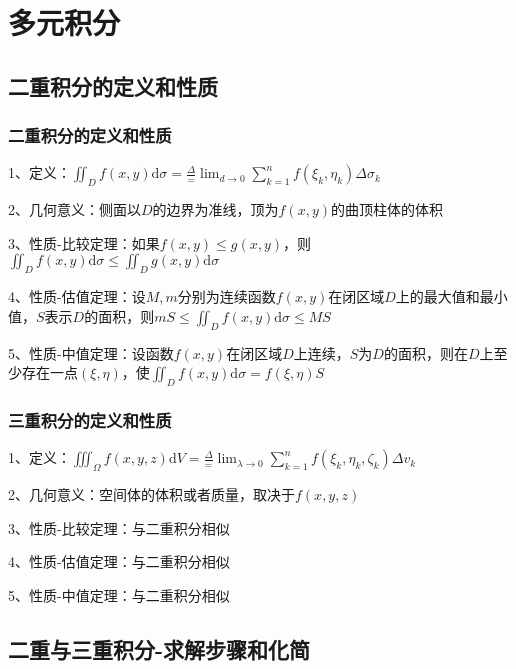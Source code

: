 \chapter{多元积分}

\section{二重积分的定义和性质}



\subsection{二重积分的定义和性质}

1、定义：$\iint_{D} f(x, y) \mathrm{d} \sigma=\frac{\Delta}{=} \lim _{d \rightarrow 0} \sum_{k=1}^{n} f\left(\xi_{k}, \eta_{k}\right) \Delta \sigma_{k}$

2、几何意义：侧面以$D$的边界为准线，顶为$f(x, y)$的曲顶柱体的体积

3、性质-比较定理：如果$f(x, y) \leqslant g(x, y)$，则$\iint_{D} f(x, y) \mathrm{d} \sigma \leqslant \iint_{D} g(x, y) \mathrm{d} \sigma$

4、性质-估值定理：设$M, m$分别为连续函数$f(x, y)$在闭区域$D$上的最大值和最小值，$S$表示$D$的面积，则$m S \leqslant \iint_{D} f(x, y) \mathrm{d} \sigma \leqslant M S$

5、性质-中值定理：设函数$f(x, y)$在闭区域$D$上连续，$S$为$D$的面积，则在$D$上至少存在一点$(\xi, \eta)$，使$\iint_{D} f(x, y) \mathrm{d} \sigma=f(\xi, \eta) S$



\subsection{三重积分的定义和性质}

1、定义：$\iiint_{\Omega} f(x, y,z) \mathrm{d} V=\frac{\Delta}{=} \lim _{\lambda \rightarrow 0} \sum_{k=1}^{n} f\left(\xi_{k}, \eta_{k},\zeta_{k} \right) \Delta v_{k}$

2、几何意义：空间体的体积或者质量，取决于$f(x, y,z) $

3、性质-比较定理：与二重积分相似

4、性质-估值定理：与二重积分相似

5、性质-中值定理：与二重积分相似

\section{二重与三重积分-求解步骤和化简}



